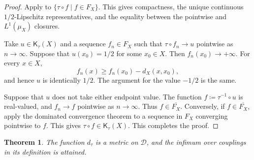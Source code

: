 \documentclass[10pt,a4paper]{amsart}
\newtheorem{theorem}{Theorem}[section]
\newcommand{\D}{\mathcal D}
\newcommand{\Kc}{\mathsf K}
\newcommand{\dtau}{d_{\tau}}
\begin{document}
\begin{proof}
Apply  to $\{\tau\circ f\mid f\in F_X\}$. This gives compactness, the unique continuous $1/2$-Lipschitz representatives, and the equality between the pointwise and $L^1(\mu_X)$ closures.

Take $u\in\Kc_\tau(X)$ and a sequence $f_n\in F_X$ such that $\tau\circ f_n\to u$ pointwise as $n\to\infty$. Suppose that $u(x_0)=1/2$ for some $x_0\in X$. Then $f_n(x_0)\to+\infty$. For every $x\in X$,
\[
f_n(x)\geq f_n(x_0)-d_X(x,x_0),
\]
and hence $u$ is identically $1/2$. The argument for the value $-1/2$ is the same.

Suppose that $u$ does not take either endpoint value. The function $f\coloneqq\tau^{-1}\circ u$ is real-valued, and $f_n\to f$ pointwise as $n\to\infty$. Thus $f\in\overline{F_X}$. Conversely, if $f\in\overline{F_X}$, apply the dominated convergence theorem \cite[Theorem~3.31, pp.~92--93]{axler2020mira} to a sequence in $F_X$ converging pointwise to $f$. This gives $\tau\circ f\in\Kc_\tau(X)$. This completes the proof.
\end{proof}

\begin{theorem}
\label{thm:dtau-metric}
The function $\dtau$ is a metric on $\D$, and the infimum over couplings in its definition is attained.
\end{theorem}
\end{document}
